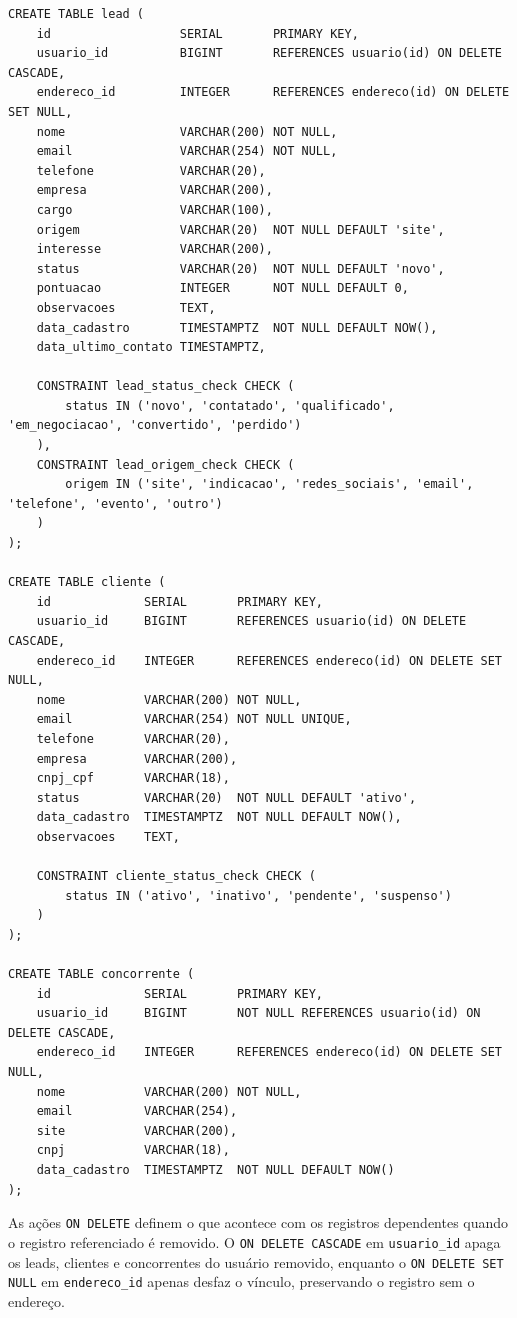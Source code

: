 \documentclass[a4paper]{article}
\begin{document}
\begin{verbatim}
CREATE TABLE lead (
    id                  SERIAL       PRIMARY KEY,
    usuario_id          BIGINT       REFERENCES usuario(id) ON DELETE CASCADE,
    endereco_id         INTEGER      REFERENCES endereco(id) ON DELETE SET NULL,
    nome                VARCHAR(200) NOT NULL,
    email               VARCHAR(254) NOT NULL,
    telefone            VARCHAR(20),
    empresa             VARCHAR(200),
    cargo               VARCHAR(100),
    origem              VARCHAR(20)  NOT NULL DEFAULT 'site',
    interesse           VARCHAR(200),
    status              VARCHAR(20)  NOT NULL DEFAULT 'novo',
    pontuacao           INTEGER      NOT NULL DEFAULT 0,
    observacoes         TEXT,
    data_cadastro       TIMESTAMPTZ  NOT NULL DEFAULT NOW(),
    data_ultimo_contato TIMESTAMPTZ,

    CONSTRAINT lead_status_check CHECK (
        status IN ('novo', 'contatado', 'qualificado', 'em_negociacao', 'convertido', 'perdido')
    ),
    CONSTRAINT lead_origem_check CHECK (
        origem IN ('site', 'indicacao', 'redes_sociais', 'email', 'telefone', 'evento', 'outro')
    )
);

CREATE TABLE cliente (
    id             SERIAL       PRIMARY KEY,
    usuario_id     BIGINT       REFERENCES usuario(id) ON DELETE CASCADE,
    endereco_id    INTEGER      REFERENCES endereco(id) ON DELETE SET NULL,
    nome           VARCHAR(200) NOT NULL,
    email          VARCHAR(254) NOT NULL UNIQUE,
    telefone       VARCHAR(20),
    empresa        VARCHAR(200),
    cnpj_cpf       VARCHAR(18),
    status         VARCHAR(20)  NOT NULL DEFAULT 'ativo',
    data_cadastro  TIMESTAMPTZ  NOT NULL DEFAULT NOW(),
    observacoes    TEXT,

    CONSTRAINT cliente_status_check CHECK (
        status IN ('ativo', 'inativo', 'pendente', 'suspenso')
    )
);

CREATE TABLE concorrente (
    id             SERIAL       PRIMARY KEY,
    usuario_id     BIGINT       NOT NULL REFERENCES usuario(id) ON DELETE CASCADE,
    endereco_id    INTEGER      REFERENCES endereco(id) ON DELETE SET NULL,
    nome           VARCHAR(200) NOT NULL,
    email          VARCHAR(254),
    site           VARCHAR(200),
    cnpj           VARCHAR(18),
    data_cadastro  TIMESTAMPTZ  NOT NULL DEFAULT NOW()
);
\end{verbatim}

As ações \texttt{ON DELETE} definem o que acontece com os registros dependentes quando o
registro referenciado é removido. O \texttt{ON DELETE CASCADE} em \texttt{usuario\_id}
apaga os leads, clientes e concorrentes do usuário removido, enquanto o
\texttt{ON DELETE SET NULL} em \texttt{endereco\_id} apenas desfaz o vínculo, preservando o
registro sem o endereço.
\end{document}
